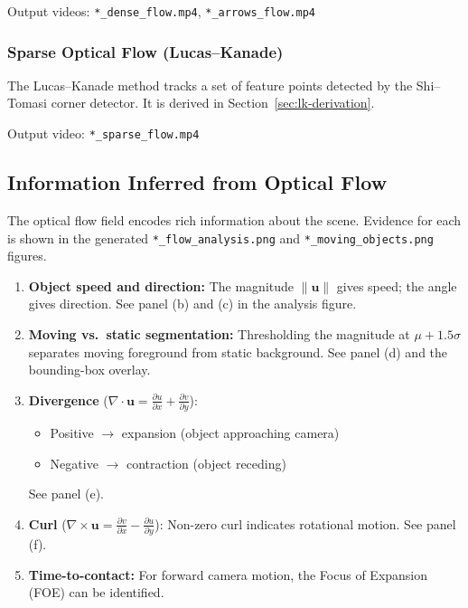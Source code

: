 \documentclass[12pt, a4paper]{article}
\begin{document}
Output videos: \texttt{*\_dense\_flow.mp4}, \texttt{*\_arrows\_flow.mp4}

\subsubsection{Sparse Optical Flow (Lucas--Kanade)}

The Lucas--Kanade method tracks a set of feature points detected by the Shi--Tomasi corner detector.  It is derived in Section~\ref{sec:lk-derivation}.

Output video: \texttt{*\_sparse\_flow.mp4}

\subsection{Information Inferred from Optical Flow}
\label{sec:flow-inference}

The optical flow field encodes rich information about the scene.  Evidence for each is shown in the generated \texttt{*\_flow\_analysis.png} and \texttt{*\_moving\_objects.png} figures.

\begin{enumerate}
  \item \textbf{Object speed and direction:}  The magnitude $\|\mathbf{u}\|$ gives speed; the angle gives direction.  See panel (b) and (c) in the analysis figure.

  \item \textbf{Moving vs.\ static segmentation:}  Thresholding the magnitude at $\mu + 1.5\sigma$ separates moving foreground from static background.  See panel (d) and the bounding-box overlay.

  \item \textbf{Divergence} ($\nabla \cdot \mathbf{u} = \frac{\partial u}{\partial x} + \frac{\partial v}{\partial y}$):
  \begin{itemize}
    \item Positive $\rightarrow$ expansion (object approaching camera)
    \item Negative $\rightarrow$ contraction (object receding)
  \end{itemize}
  See panel (e).

  \item \textbf{Curl} ($\nabla \times \mathbf{u} = \frac{\partial v}{\partial x} - \frac{\partial u}{\partial y}$):
  Non-zero curl indicates rotational motion.  See panel (f).

  \item \textbf{Time-to-contact:}  For forward camera motion, the Focus of Expansion (FOE) can be identified.
\end{enumerate}
\end{document}
